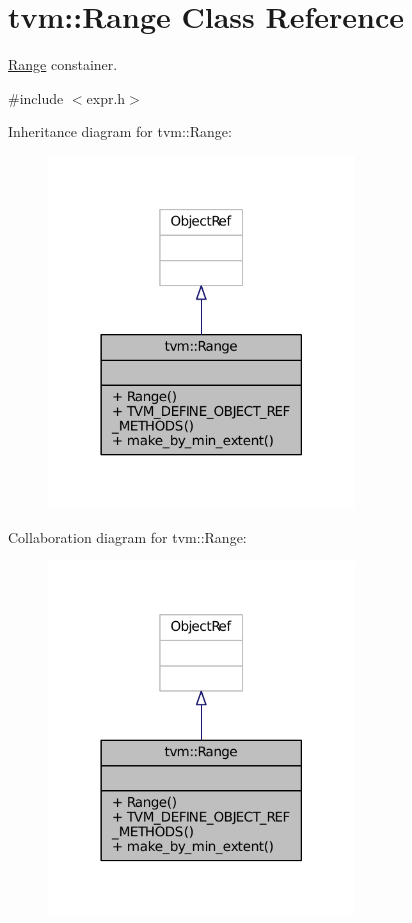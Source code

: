 \hypertarget{classtvm_1_1Range}{}\section{tvm\+:\+:Range Class Reference}
\label{classtvm_1_1Range}


\hyperlink{classtvm_1_1Range}{Range} constainer.  




{\ttfamily \#include $<$expr.\+h$>$}



Inheritance diagram for tvm\+:\+:Range\+:
\nopagebreak
\begin{figure}[H]
\begin{center}
\leavevmode
\includegraphics[width=230pt]{classtvm_1_1Range__inherit__graph}
\end{center}
\end{figure}


Collaboration diagram for tvm\+:\+:Range\+:
\nopagebreak
\begin{figure}[H]
\begin{center}
\leavevmode
\includegraphics[width=230pt]{classtvm_1_1Range__coll__graph}
\end{center}
\end{figure}

